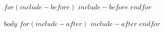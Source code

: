 \documentclass[$if(font-size)$$font-size$$else$12$endif$pt]{harvardchapter}
\begin{document}
\setlength{\abovedisplayskip}{6pt}
\setlength{\belowdisplayskip}{6pt}
\setlength{\abovedisplayshortskip}{6pt}
\setlength{\belowdisplayshortskip}{6pt}

$for(include-before)$
$include-before$
$endfor$

$body$
\clearpage
$for(include-after)$
$include-after$
$endfor$
\end{document}
